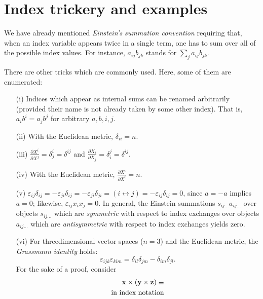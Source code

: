 \section{Index trickery and examples}

We have already mentioned {\em Einstein's summation convention}
requiring that, when an index variable appears twice in a single term, one has to
sum over all of the possible index values. For instance, $a_{ij}b_{jk}$ stands for $\sum_j a_{ij}b_{jk}$.

There are other tricks which are commonly used.
Here, some of them are enumerated:

\begin{itemize}
\item[(i)]
Indices which appear as internal sums can be renamed arbitrarily
(provided their name is not already taken by some other index).
That is, $a_ib^i=a_jb^j$ for arbitrary $a,b,i,j$.
\item[(ii)]
With the Euclidean metric, $\delta_{ii}=n$.
\item[(iii)]
$\frac{\partial X^i }{\partial X^j}=\delta^i_j=\delta^{ij}$ and
$\frac{\partial X_i }{\partial X_j}=\delta_i^j=\delta^{ij}$.
\item[(iv)]
With the Euclidean metric, $\frac{\partial X^i }{ \partial X^i}=n$.
\item[(v)]
$\varepsilon_{ij}\delta_{ij}=-\varepsilon_{ji}\delta_{ij}=-\varepsilon_{ji}\delta_{ji}=(i \leftrightarrow j)=-\varepsilon_{ij}\delta_{ij}=0$,
since $a=-a$ implies $a=0$;
likewise, $\varepsilon_{ij}x_i x_j=0$.
In general, the Einstein summations $s_{ij\ldots }a_{ij\ldots}$ over objects $s_{ij\ldots }$ which are {\em symmetric} with respect to index exchanges
over objects $a_{ij\ldots}$ which are {\em antisymmetric}  with respect to index exchanges yields zero.
\item[(vi)]
For threedimensional vector spaces ($n=3$)  and the Euclidean metric,
the {\em Grassmann identity} holds:
\begin{equation}
 \varepsilon_{ijk}\varepsilon_{klm}
=  \delta_{il}\delta_{jm}-\delta_{im}\delta_{jl}.
\label{2011-m-egi}
\end{equation}
{\color{OliveGreen}
\bproof
For the sake of a proof, consider
\begin{equation}
\begin{split}
{\bf x} \times ({\bf y} \times {\bf z}) \equiv \\
\textrm{in index notation}\\

\end{split}
\end{equation}}
\end{itemize}

